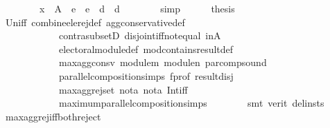 \begin{isabellebody}
\ \ \ \ \ \ \ \ x\ {\isasymin}\ A\ {\isacharminus}{\kern0pt}\ {\isacharparenleft}{\kern0pt}e{}\ {\isasymunion}\ e{}\ {\isasymunion}\ d{}\ {\isasymunion}\ d{}{\isacharparenright}{\kern0pt}{\isachardoublequoteclose}\isanewline
\ \ \ \ \ \ \isamarkupfalse%
\ simp\isanewline
\ \ \ \ \isamarkupfalse%
\ {\isacharquery}{\kern0pt}thesis\isanewline
\ \ \ \ \ \ \isamarkupfalse%
\ Un{\isacharunderscore}{\kern0pt}iff\ combine{\isacharunderscore}{\kern0pt}ele{\isacharunderscore}{\kern0pt}rej{\isacharunderscore}{\kern0pt}def\ agg{\isacharunderscore}{\kern0pt}conservative{\isacharunderscore}{\kern0pt}def\isanewline
\ \ \ \ \ \ \ \ \ \ \ \ contra{\isacharunderscore}{\kern0pt}subsetD\ disjoint{\isacharunderscore}{\kern0pt}iff{\isacharunderscore}{\kern0pt}not{\isacharunderscore}{\kern0pt}equal\ in{\isacharunderscore}{\kern0pt}A\isanewline
\ \ \ \ \ \ \ \ \ \ \ \ electoral{\isacharunderscore}{\kern0pt}module{\isacharunderscore}{\kern0pt}def\ mod{\isacharunderscore}{\kern0pt}contains{\isacharunderscore}{\kern0pt}result{\isacharunderscore}{\kern0pt}def\isanewline
\ \ \ \ \ \ \ \ \ \ \ \ max{\isacharunderscore}{\kern0pt}agg{\isacharunderscore}{\kern0pt}consv\ module{\isacharunderscore}{\kern0pt}m\ module{\isacharunderscore}{\kern0pt}n\ par{\isacharunderscore}{\kern0pt}comp{\isacharunderscore}{\kern0pt}sound\isanewline
\ \ \ \ \ \ \ \ \ \ \ \ parallel{\isacharunderscore}{\kern0pt}composition{\isachardot}{\kern0pt}simps\ f{\isacharunderscore}{\kern0pt}prof\ result{\isacharunderscore}{\kern0pt}disj\isanewline
\ \ \ \ \ \ \ \ \ \ \ \ max{\isacharunderscore}{\kern0pt}agg{\isacharunderscore}{\kern0pt}rej{\isacharunderscore}{\kern0pt}set\ not{\isacharunderscore}{\kern0pt}a{}\ not{\isacharunderscore}{\kern0pt}a{}\ Int{\isacharunderscore}{\kern0pt}iff\isanewline
\ \ \ \ \ \ \ \ \ \ \ \ maximum{\isacharunderscore}{\kern0pt}parallel{\isacharunderscore}{\kern0pt}composition{\isachardot}{\kern0pt}simps\isanewline
\ \ \ \ \ \ \isamarkupfalse%
\ {\isacharparenleft}{\kern0pt}smt\ {\isacharparenleft}{\kern0pt}verit{\isacharcomma}{\kern0pt}\ del{\isacharunderscore}{\kern0pt}insts{\isacharparenright}{\kern0pt}{\isacharparenright}{\kern0pt}\isanewline
\ \ \isamarkupfalse%
\isanewline
{}\isamarkupfalse%
%
\endisatagproof
{\isafoldproof}%
%
\isadelimproof
\isanewline
%
\endisadelimproof
\isanewline
{}\isamarkupfalse%
\ max{\isacharunderscore}{\kern0pt}agg{\isacharunderscore}{\kern0pt}rej{\isacharunderscore}{\kern0pt}iff{\isacharunderscore}{\kern0pt}both{\isacharunderscore}{\kern0pt}reject{\isacharcolon}{\kern0pt}\isanewline

\end{isabellebody}
